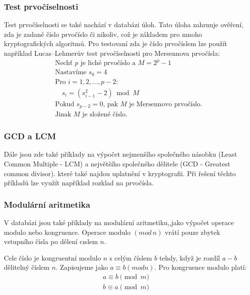 \documentclass[titlepage]{article}
\begin{document}
\subsubsection{Test prvočíselnosti}
Test prvočíselnosti se také nachází v databázi úloh. Tato úloha zahrnuje ověření, zda je zadané číslo prvočíslo či nikoliv, což je základem pro mnoho kryptografických algoritmů. Pro testovaní zda je číslo prvočíslem lze použít například Lucas–Lehmerův test prvočíselnosti pro Mersennova prvočísla:
\begin{align*}
    &\text{Nechť } p \text{ je liché prvočíslo a } M = 2^p-1 \\
    &\text{Nastavíme } s_0 = 4 \\
    &\text{Pro } i=1,2,\dots,p-2: \\
    &\quad s_i = (s_{i-1}^2-2) \bmod M \\
    &\text{Pokud } s_{p-2} = 0 \text{, pak } M \text{ je Mersennovo prvočíslo.} \\
    &\text{Jinak } M \text{ je složené číslo.}
\end{align*}

\subsubsection{GCD a LCM}
Dále jsou zde také příklady na výpočet nejmenšího společného násobku (Least Common Multiple - LCM) a největšího společného dělitele (GCD - Greatest common divisor). které také najdou uplatnění v kryptografii. Při řešení těchto příkladů lze využít například rozklad na prvočísla.
\newline

\subsubsection{Modulární aritmetika}
V databázi jsou také příklady na modulární aritmetiku,,jako výpočet operace modulo nebo kongruence. 
Operace modulo $(mod\,n)$ vrátí pouze zbytek vstupního čísla po
dělení cıslem $n$.


Cele číslo je kongruentní modulo $n$ s celým číslem $b$ tehdy, když
je rozdíl $a - b$ dělitelný číslem $n$. Zapisujeme jako $a \equiv b (mod n)$.
Pro kongruence modulo platí:
\begin{align*}
    a \equiv b \pmod{m} \\
    b \equiv a \pmod{m} \\
\end{align*}
\end{document}

